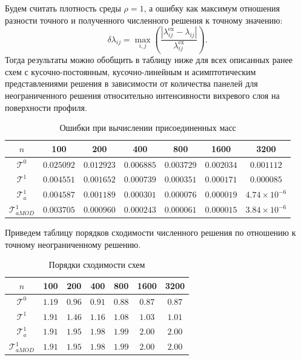 \documentclass[12pt, a4paper]{article}
\begin{document}
Будем считать плотность среды $\rho=1$, а ошибку как максимум отношения разности точного и полученного численного решения к точному значению:
\[
 \delta\lambda_{ij}=\max_{i,j}{\left(\frac{|\lambda^{\mathrm{ex}}_{ij}-\lambda_{ij}|}{\lambda^{\mathrm{ex}}_{ij}}\right)}.
\]
Тогда результаты можно обобщить в таблицу ниже для всех описанных ранее схем с кусочно-постоянным, кусочно-линейным и асимптотическим представлениями решения в зависимости от количества панелей для неограниченного решения относительно интенсивности вихревого слоя на поверхности профиля.\bigskip
\begin{table}[!h]
	\label{errors}
	\centering		
	\caption{Ошибки при вычислении присоединенных масс}\medskip	
	\begin{tabular}{|c|c|c|c|c|c|c|}		
		\hline
		$n$ & 100 & 200 & 400 & 800 & 1600 & 3200 \\\hline
		$\mathcal{T}^0$ & $0.025092$ & $0.012923$ & $0.006885$ & $0.003729$ & $0.002034$ & $0.001112$ \\\hline
		$\mathcal{T}^1$ & $0.004551$ & $0.001652$ & $0.000739$ & $0.000351$ & $0.000171$ & $0.000085$ \\
		\hline
		$\mathcal{T}^1_{a}$ & $0.004587$ & $0.001189$ &  $0.000301$ & $0.000076$ & $0.000019$ & $4.74\times10^{-6}$ \\\hline
		$\mathcal{T}^1_{aMOD}$ & $0.003705$ & $0.000960$ &  $0.000243$ & $0.000061$ & $0.000015$ & $3.84\times10^{-6}$ \\
		\hline
	\end{tabular}
\end{table}	
 
 Приведем таблицу порядков сходимости численного решения по отношению к точному неограниченному решению.

\begin{table}[!h]
	\centering	
	\caption{Порядки сходимости схем}\medskip					
	\begin{tabular}{|c|c|c|c|c|c|c|}
		\hline
		$n$ & 100 & 200 & 400 & 800 & 1600 & 3200 \\ \hline
		$\mathcal{T}^0$ & $1.19$ & $0.96$ & $0.91$ & $0.88$ & $0.87$ & $0.87$\\
		\hline
		$\mathcal{T}^1$ & $1.91$ & $1.46$ & $1.16$ & $1.08$ & $1.03$ & $1.01$\\
		\hline
		$\mathcal{T}^1_{a}$ & $1.91$ & $1.95$ & $1.98$ & $1.99$ & $2.00$ & $2.00$ \\
		\hline
		$\mathcal{T}^1_{aMOD}$ & $1.91$ & $1.95$ & $1.98$ & $1.99$ & $2.00$ & $2.00$\\
		\hline
	\end{tabular}
\end{table}
\end{document}
